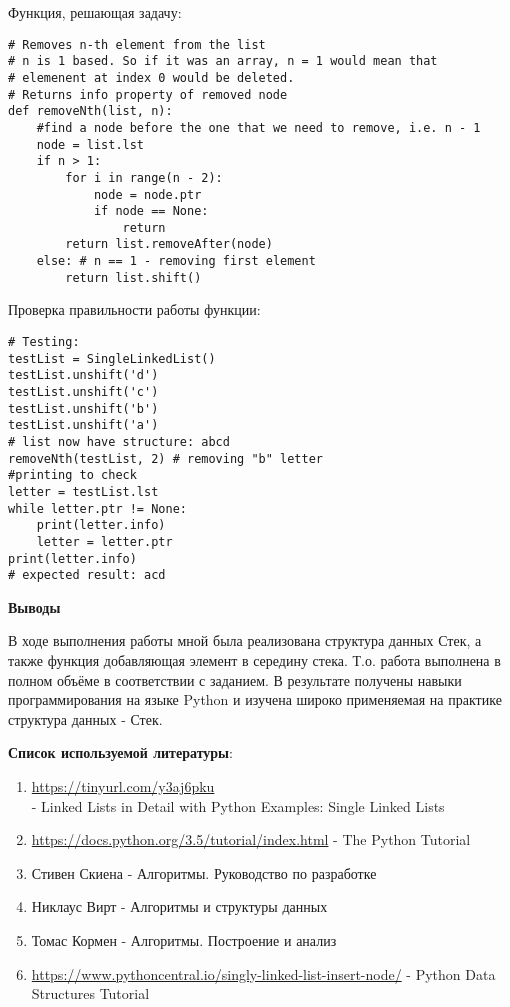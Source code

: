 \documentclass[12pt]{article}
\begin{document}
Функция, решающая задачу:
\begin{verbatim}
# Removes n-th element from the list
# n is 1 based. So if it was an array, n = 1 would mean that
# elemenent at index 0 would be deleted.
# Returns info property of removed node
def removeNth(list, n):
	#find a node before the one that we need to remove, i.e. n - 1
	node = list.lst
	if n > 1:
		for i in range(n - 2):
			node = node.ptr
			if node == None:
				return
		return list.removeAfter(node)
	else: # n == 1 - removing first element
		return list.shift()
\end{verbatim}

Проверка правильности работы функции:
\begin{verbatim}
# Testing:
testList = SingleLinkedList()
testList.unshift('d')
testList.unshift('c')
testList.unshift('b')
testList.unshift('a')
# list now have structure: abcd
removeNth(testList, 2) # removing "b" letter
#printing to check
letter = testList.lst
while letter.ptr != None:
	print(letter.info)
	letter = letter.ptr
print(letter.info) 
# expected result: acd
\end{verbatim}

\pagebreak
\textbf{Выводы}

В ходе выполнения работы мной была реализована структура данных Стек, а также функция добавляющая элемент в середину стека. Т.о. работа выполнена в полном объёме в соответствии с заданием. В результате получены навыки программирования на языке Python и изучена широко применяемая на практике структура данных - Стек.
\par\bigskip
\textbf{Список используемой литературы}:
\begin{enumerate}


\item \url{https://tinyurl.com/y3aj6pku} \\ - Linked Lists in Detail with Python Examples: Single Linked Lists

\item \url{https://docs.python.org/3.5/tutorial/index.html} - The Python Tutorial
\item Стивен Скиена - Алгоритмы. Руководство по разработке
\item Никлаус Вирт - Алгоритмы и структуры данных
\item Томас Кормен - Алгоритмы. Построение и анализ
\item \url{https://www.pythoncentral.io/singly-linked-list-insert-node/} - Python Data Structures Tutorial
\end{enumerate}
\end{document}
